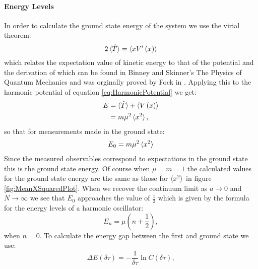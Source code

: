 \documentclass[12pt]{article}
\begin{document}
            \paragraph{Energy Levels}
                In order to calculate the ground state energy of the system we use the virial theorem:
                \begin{equation}
                    \label{eq:VirialTheorem}
                    2\braket{\hat{T}} = \braket{xV'\left(x\right)}
                \end{equation}
                which relates the expectation value of kinetic energy to that of the potential and the derivation of which can be found in Binney and Skinner's The Physics of Quantum Mechanics \cite{binney_skinner_2015} and was orginally proved by Fock in \cite{fock_1930}. Applying this to the harmonic potential of equation \ref{eq:HarmonicPotential} we get:
                \begin{align}
                    \label{eq:HarmonicVirialTheorem}  E & = \braket{\hat{T}} +\braket{V\left(x\right)} \\
                                                        & = m\mu^2\braket{x^2},
                \end{align}
                so that for measurements made in the ground state:
                \begin{align}
                    \label{eq:HarmonicGroundStateEnergy}
                    E_0 = m\mu^2\braket{x^2}
                \end{align}
                Since the measured observables correspond to expectations in the ground state this is the ground state energy. Of course when $\mu=m=1$ the calculated values for the ground state energy are the same as those for $\braket{x^2}$ in figure \ref{fig:MeanXSquaredPlot}. When we recover the continuum limit as $a\rightarrow0$ and $N\rightarrow\infty$ we see that $E_0$ approaches the value of $\frac{1}{2}$ which is given by the formula for the energy levels of a harmonic oscillator:
                \begin{equation}
                    \label{eq:ContinuumEnergyLevels}
                    E_n=\mu\left(n+\frac{1}{2}\right),
                \end{equation}
                when $n=0$.
                To calculate the energy gap between the first and ground state we use:
                \begin{equation}
                    \label{eq:FirstExcitedStateHarmonicOscillator}
                    \Delta E\left(\delta \tau\right) = -\frac{1}{\delta \tau} \ln C\left(\delta \tau\right),
                \end{equation}
\end{document}
